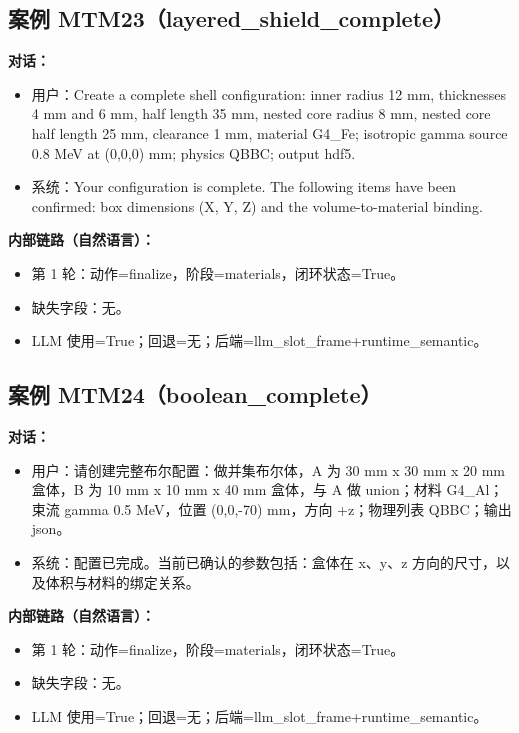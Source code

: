 \documentclass[11pt]{ctexart}
\begin{document}
\subsection{案例 MTM23（layered\_shield\_complete）}
\textbf{对话：}
\begin{itemize}
\item 用户：Create a complete shell configuration: inner radius 12 mm, thicknesses 4 mm and 6 mm, half length 35 mm, nested core radius 8 mm, nested core half length 25 mm, clearance 1 mm, material G4\_Fe; isotropic gamma source 0.8 MeV at (0,0,0) mm; physics QBBC; output hdf5.
\item 系统：Your configuration is complete. The following items have been confirmed: box dimensions (X, Y, Z) and the volume-to-material binding.
\end{itemize}
\textbf{内部链路（自然语言）：}
\begin{itemize}
\item 第 1 轮：动作=finalize，阶段=materials，闭环状态=True。
\item 缺失字段：无。
\item LLM 使用=True；回退=无；后端=llm\_slot\_frame+runtime\_semantic。
\end{itemize}
\subsection{案例 MTM24（boolean\_complete）}
\textbf{对话：}
\begin{itemize}
\item 用户：请创建完整布尔配置：做并集布尔体，A 为 30 mm x 30 mm x 20 mm 盒体，B 为 10 mm x 10 mm x 40 mm 盒体，与 A 做 union；材料 G4\_Al；束流 gamma 0.5 MeV，位置 (0,0,-70) mm，方向 +z；物理列表 QBBC；输出 json。
\item 系统：配置已完成。当前已确认的参数包括：盒体在 x、y、z 方向的尺寸，以及体积与材料的绑定关系。
\end{itemize}
\textbf{内部链路（自然语言）：}
\begin{itemize}
\item 第 1 轮：动作=finalize，阶段=materials，闭环状态=True。
\item 缺失字段：无。
\item LLM 使用=True；回退=无；后端=llm\_slot\_frame+runtime\_semantic。
\end{itemize}
\end{document}
